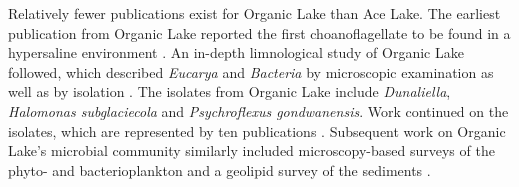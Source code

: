 Relatively fewer publications exist for Organic Lake than Ace Lake.
The earliest publication from Organic Lake reported the first choanoflagellate to be found in a hypersaline environment \cite{vandenHoff1986}.
An in-depth limnological study of Organic Lake followed, which described \emph{Eucarya} and \emph{Bacteria} by microscopic examination as well as by isolation \cite{Franzmann1987b}.
The isolates from Organic Lake include \emph{Dunaliella}, \emph{Halomonas subglaciecola} and \emph{Psychroflexus gondwanensis}.
Work continued on the isolates, which are represented by ten publications \cite{Burch1983, Franzmann1987a, McMeekin1988b, James1990, Dobson1991, Dobson1993, Marchant1993, Bowman1998, McCammon2000, VanTrappen2004}.
Subsequent work on Organic Lake's microbial community similarly included microscopy-based surveys of the phyto- and bacterioplankton \cite{Roberts1996, Perriss1997} and a geolipid survey of the sediments \cite{Rogerson1996}.

